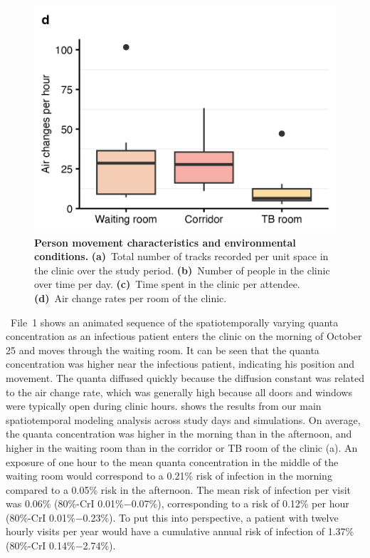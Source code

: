\documentclass[fleqn,11pt]{wlscirep}
\begin{document}
\begin{figure}
    \includegraphics{results/data/air-changes-per-hour.png}
    \caption{\textbf{Person movement characteristics and environmental conditions.} \textbf{(a)}~Total number of tracks recorded per unit space in the clinic over the study period. \textbf{(b)}~Number of people in the clinic over time per day. \textbf{(c)}~Time spent in the clinic per attendee. \textbf{(d)}~Air change rates per room of the clinic.}
    \label{fig:input-data-descriptives}
\end{figure}

\supp~File~1 shows an animated sequence of the spatiotemporally varying quanta concentration as an infectious patient enters the clinic on the morning of October 25 and moves through the waiting room. It can be seen that the quanta concentration was higher near the infectious patient, indicating his position and movement. The quanta diffused quickly because the diffusion constant was related to the air change rate, which was generally high because all doors and windows were typically open during clinic hours.  shows the results from our main spatiotemporal modeling analysis across study days and simulations. On average, the quanta concentration was higher in the morning than in the afternoon, and higher in the waiting room than in the corridor or TB room of the clinic (a). An exposure of one hour to the mean quanta concentration in the middle of the waiting room would correspond to a 0.21\% risk of infection in the morning compared to a 0.05\% risk in the afternoon. The mean risk of infection per visit was 0.06\% (80\%-CrI 0.01\%$-$0.07\%), corresponding to a risk of 0.12\% per hour (80\%-CrI 0.01\%$-$0.23\%). To put this into perspective, a patient with twelve hourly visits per year would have a cumulative annual risk of infection of 1.37\% (80\%-CrI 0.14\%$-$2.74\%). 
\end{document}
